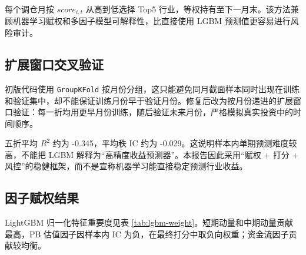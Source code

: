 \documentclass[UTF8,a4paper,12pt]{ctexart}
\begin{document}
每个调仓月按 $score_{i,t}$ 从高到低选择 Top5 行业，等权持有至下一月末。该方法兼顾机器学习赋权和多因子模型可解释性，比直接使用 LGBM 预测值更容易进行风险审计。

\subsection{扩展窗口交叉验证}

初版代码使用 \texttt{GroupKFold} 按月份分组，这只能避免同月截面样本同时出现在训练和验证集中，却不能保证训练月份早于验证月份。修复后改为按月份递进的扩展窗口验证：每一折均用更早月份训练，随后验证未来月份，严格模拟真实投资中的时间顺序。

\begin{table}[H]
    \centering
    \scriptsize
    \caption{LightGBM 时序交叉验证结果}
    \label{tab:cv}
\end{table}

五折平均 $R^2$ 约为 -0.345，平均秩 IC 约为 -0.029。这说明样本内单期预测难度较高，不能把 LGBM 解释为“高精度收益预测器”。本报告因此采用“赋权 + 打分 + 风控”的稳健框架，而不是宣称机器学习能直接稳定预测行业收益。

\subsection{因子赋权结果}

LightGBM 归一化特征重要度见表 \ref{tab:lgbm-weight}。短期动量和中期动量贡献最高，PB 估值因子因样本内 IC 为负，在最终打分中取负向权重；资金流因子贡献较均衡。
\end{document}
